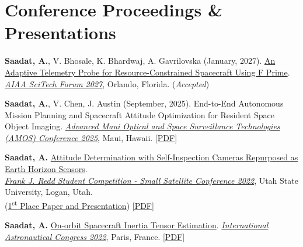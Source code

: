 \documentclass[letterpaper,11pt]{article}
\newcommand{\shiftleft}[2]{\makebox[0pt][r]{\makebox[#1][l]{#2}}}
\newcommand{\cvIcon}[1]{\BeginAccSupp{ActualText={}}#1\EndAccSupp{}}
\def\shiftleft#1#2{}%
\def\faFile{}%
\begin{document}
\section[Conference Proceedings \& Presentations]{\shiftleft{18pt}{\cvIcon{\faFile}}Conference Proceedings \& Presentations}
 \begin{itemize}[leftmargin=0.15in, label={}]
    \small{

    \item{\textbf{Saadat, A.}, V. Bhosale, K. Bhardwaj, A. Gavrilovska (January, 2027). \href{https://atillasaadat.com/post/adaptive-telemetry-probe-for-resource-constrained-spacecraft-using-f-prime/}{An Adaptive Telemetry Probe for Resource-Constrained Spacecraft Using F Prime}. \emph{\href{https://scitech.aiaa.org/}{AIAA SciTech Forum 2027}}, Orlando, Florida. (\textit{Accepted})}

    \item{\textbf{Saadat, A.}, V. Chen, J. Austin (September, 2025). End-to-End Autonomous Mission Planning and Spacecraft Attitude Optimization for Resident Space Object Imaging. \href{https://amostech.space/year/2025/end-to-end-autonomous-mission-planning-and-spacecraft-attitude-optimization-for-resident-space-object-imaging/}{\emph{Advanced Maui Optical and Space Surveillance Technologies (AMOS) Conference 2025}}, Maui, Hawaii. \href{https://www.researchgate.net/publication/395773467_End-to-End_Autonomous_Mission_Planning_and_Spacecraft_Attitude_Optimization_for_Resident_Space_Object_Imaging}{[PDF]}}

    
    \item{\textbf{Saadat, A.} \href{https://atillasaadat.com/post/masc-thesis-ch-3-earth-horizon-sensor-development/}{Attitude Determination with Self-Inspection Cameras Repurposed as Earth Horizon Sensors}.\\\emph{\href{https://smallsat.org/students/student-competition/}{Frank J. Redd Student Competition - Small Satellite Conference 2022}}, Utah State University, Logan, Utah. \\(\href{https://smallsat.org/students/previous-winners}{1\textsuperscript{st} Place Paper and Presentation}) \href{https://digitalcommons.usu.edu/smallsat/2022/all2022/3/}{[PDF]}}
        
    \item{\textbf{Saadat, A.} \href{https://atillasaadat.com/post/masc-thesis-ch-2-on-orbit-spacecraft-inertia-tensor-estimation/}{On-orbit Spacecraft Inertia Tensor Estimation}. \emph{\href{https://www.iafastro.org/events/iac/iac-2022/}{International Astronautical Congress 2022}}, Paris, France. \href{https://www.researchgate.net/publication/365595291_On-orbit_Spacecraft_Inertia_Tensor_Estimation}{[PDF]}}
    
}
\end{itemize}
\end{document}
